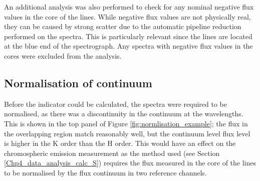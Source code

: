 An additional analysis was also performed to check for any nominal negative flux values in the core of the \caII lines. While negative flux values are not physically real, they can be caused by strong scatter due to the automatic pipeline reduction performed on the spectra. This is particularly relevant since the \caII lines are located at the blue end of the spectrograph. Any spectra with negative flux values in the \caII cores were excluded from the analysis.

\subsection{Normalisation of continuum}
\label{Chp4_data_analysis_normalise_cont}
Before the \Rprime indicator could be calculated, the spectra were required to be normalised, as there was a discontinuity in the continuum at the \caII wavelengths. This is shown in the top panel of Figure \ref{fig:normlisation_example}; the flux in the overlapping region match reasonably well, but the continuum level flux level is higher in the K order than the H order. This would have an effect on the chromospheric emission measurement as the method used (see Section \ref{Chp4_data_analysis_calc_S}) requires the flux measured in the core of the \caII lines to be normalised by the flux continuum in two reference channels.

